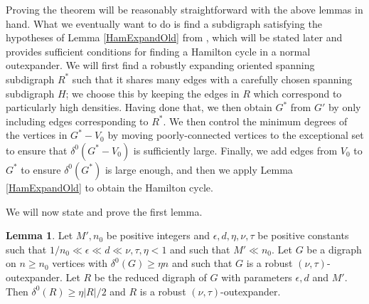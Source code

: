 \documentclass[10pt,letterpaper, reqno]{amsart}
\theoremstyle{definition}
\newtheorem{lemma}[thm]{Lemma}
\numberwithin{equation}{section}
\begin{document}
Proving the theorem will be reasonably straightforward with the above lemmas in hand. What we eventually want to do is find a subdigraph satisfying the hypotheses of Lemma \ref{HamExpandOld} from \cite{HamCycleNormalExpander}, which will be stated later and provides sufficient conditions for finding a Hamilton cycle in a normal outexpander. We will first find a robustly expanding oriented spanning subdigraph $R^*$ such that it shares many edges with a carefully chosen spanning subdigraph $H$; we choose this by keeping the edges in $R$ which correspond to particularly high densities. Having done that, we then obtain $G^*$ from $G'$ by only including edges corresponding to $R^*$. We then control the minimum degrees of the vertices in $G^*-V_0$ by moving poorly-connected vertices to the exceptional set to ensure that $\delta^0(G^*-V_0)$ is sufficiently large. Finally, we add edges from $V_0$ to $G^*$ to ensure $\delta^0(G^*)$ is large enough, and then we apply Lemma \ref{HamExpandOld} to obtain the Hamilton cycle. 

We will now state and prove the first lemma.

\begin{lemma}\label{inherit}
	Let $M',n_0$ be positive integers and $\epsilon, d, \eta, \nu, \tau$ be positive constants such that $1/n_0 \ll \epsilon \ll d \ll \nu, \tau, \eta < 1$ and such that $M' \ll n_0$. Let $G$ be a digraph on $n \geq n_0$ vertices with $\delta^0(G) \geq \eta n$ and such that $G$ is a robust $(\nu, \tau)$-outexpander. Let $R$ be the reduced digraph of $G$ with parameters $\epsilon, d$ and $M'$. Then $\delta^0(R) \geq \eta |R| /2$ and $R$ is a robust $(\nu, \tau)$-outexpander.
\end{lemma}
\end{document}
